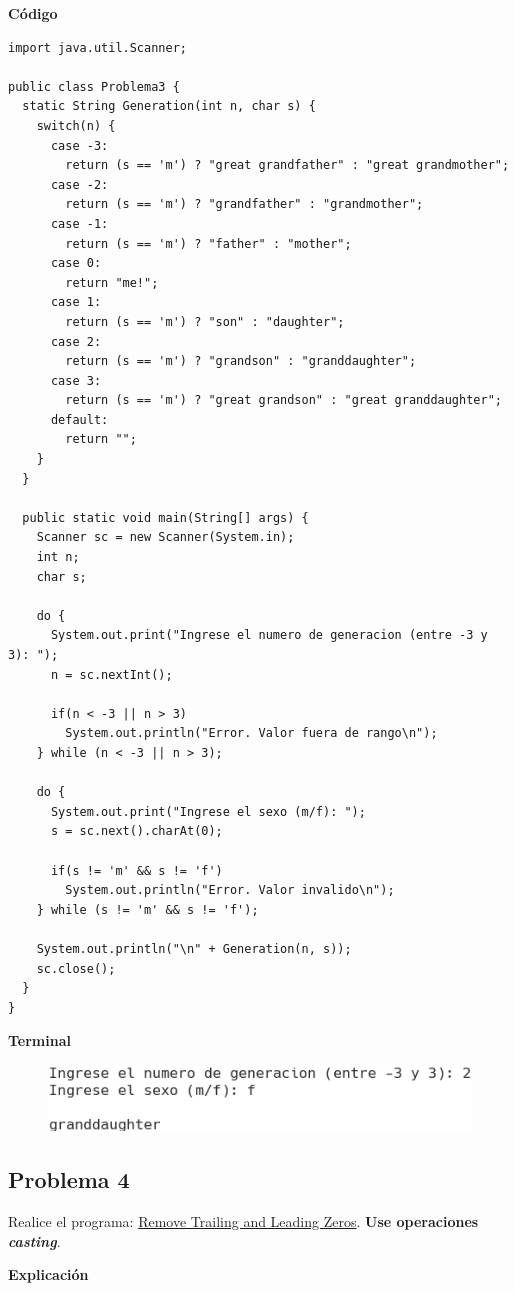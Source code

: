 \documentclass[11pt, twocolumn]{article}
\begin{document}
  \textbf{Código}
  \begin{lstlisting}
import java.util.Scanner;

public class Problema3 {
  static String Generation(int n, char s) {
    switch(n) {
      case -3:
        return (s == 'm') ? "great grandfather" : "great grandmother";
      case -2:
        return (s == 'm') ? "grandfather" : "grandmother";
      case -1:
        return (s == 'm') ? "father" : "mother";
      case 0:
        return "me!";
      case 1:
        return (s == 'm') ? "son" : "daughter";
      case 2:
        return (s == 'm') ? "grandson" : "granddaughter";
      case 3:
        return (s == 'm') ? "great grandson" : "great granddaughter";
      default:
        return "";
    }
  }   

  public static void main(String[] args) {
    Scanner sc = new Scanner(System.in);
    int n;
    char s;
    
    do {
      System.out.print("Ingrese el numero de generacion (entre -3 y 3): ");
      n = sc.nextInt();

      if(n < -3 || n > 3)
        System.out.println("Error. Valor fuera de rango\n");
    } while (n < -3 || n > 3);

    do {
      System.out.print("Ingrese el sexo (m/f): ");
      s = sc.next().charAt(0);

      if(s != 'm' && s != 'f')
        System.out.println("Error. Valor invalido\n");
    } while (s != 'm' && s != 'f');

    System.out.println("\n" + Generation(n, s));
    sc.close();
  }
}    
  \end{lstlisting}

  \textbf{Terminal}
  \begin{figure}[ht]
    \includegraphics[width=0.8\columnwidth, center]{P3.png}
  \end{figure}

  \subsection*{Problema 4}
  Realice el programa:  \href{https://edabit.com/challenge/7CWbYfRji9yhna9tf}{Remove Trailing and Leading Zeros}. \textbf{Use operaciones \textit{casting}}.

  \textbf{Explicación} 
  
\end{document}
